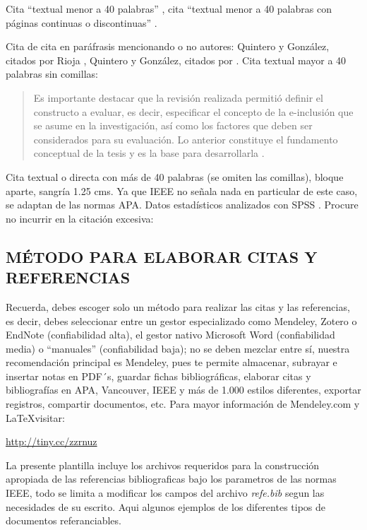 Cita “textual menor a 40 palabras” \cite[p. 466]{art:espectador}, cita “textual menor a 40 palabras con páginas continuas o discontinuas” \cite[pp. 15-16]{tes:tesis}.  %

Cita de cita en paráfrasis mencionando o no autores: Quintero y González, citados por Rioja \cite{con:conferencia}, Quintero y González, citados por \cite{con:conferencia}. Cita textual mayor a 40 palabras sin comillas:


    \begin{quotation}
    Es importante destacar que la revisión realizada permitió definir el constructo a evaluar, es decir, especificar el concepto de la e-inclusión que se asume en la investigación, así como los factores que deben ser considerados para su evaluación. Lo anterior constituye el fundamento conceptual de la tesis y es la base para desarrollarla \cite[p. 107]{art:acimed}. 
    \end{quotation}

Cita textual o directa con más de 40 palabras (se omiten las comillas), bloque aparte, sangría 1.25 cms. Ya que IEEE no señala nada en particular de este caso, se adaptan de las normas APA. Datos estadísticos analizados con SPSS \cite{opc:ibm}. Procure no incurrir en la citación excesiva: 

\newpage
\subsection*{MÉTODO PARA ELABORAR CITAS Y REFERENCIAS}

Recuerda, debes escoger solo un método para realizar las citas y las referencias, es decir, debes seleccionar entre un gestor especializado como Mendeley, Zotero o EndNote (confiabilidad alta), el gestor nativo Microsoft Word (confiabilidad media) o “manuales” (confiabilidad baja); no se deben mezclar entre sí, nuestra recomendación principal es Mendeley, pues te permite almacenar, subrayar e insertar notas en PDF´s, guardar fichas bibliográficas, elaborar citas y bibliografías en APA, Vancouver, IEEE y más de 1.000 estilos diferentes, exportar registros, compartir documentos, etc. Para mayor información de Mendeley.com y \LaTeX visitar:

\url{http://tiny.cc/zzrnuz}

La presente plantilla incluye los archivos requeridos para la construcción apropiada de las referencias bibliograficas bajo los parametros de las normas IEEE, todo se limita a modificar los campos del archivo \textit{refe.bib} segun las necesidades de su escrito. Aqui algunos ejemplos de los diferentes tipos de documentos referanciables.



